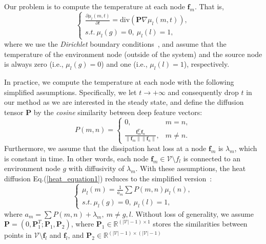 \documentclass[journal]{IEEEtran}
\begin{document}
Our problem is to compute the temperature at each node $\boldsymbol{f}_m$.
That is,
\begin{equation}\label{heat_equation1}
\left\{
\begin{array}{ll}
\frac{\partial \mu_{l}(m,t)}{\partial t}= \text{div}(\boldsymbol{P}\nabla \mu_l(m,t)),\\
s.t.~\mu_l(g)=0,~\mu_l(l)=1,
\end{array}
\right.
\end{equation}
where we use the \emph{Dirichlet} boundary conditions~\cite{weickert1998anisotropic},
and assume that the temperature of the environment node (outside of the system) and the source node
is always zero (i.e., $\mu_l(g)=0$) and one (i.e., $\mu_l(l)=1$), respectively.


In practice, we compute the temperature at each node with the following simplified assumptions.
Specifically, we let $t\rightarrow+\infty$ and consequently drop $t$ in our method
as we are interested in the steady state, and define the diffusion tensor $\boldsymbol{P}$
by the \emph{cosine} similarity between deep feature vectors:
\begin{equation}
 P(m,n)= \left\{
\begin{array}{ll}
0, & m=n,\\
\frac{\boldsymbol{f}_m^{T}\boldsymbol{f}_n}{\|\boldsymbol{f}_m\|\|\boldsymbol{f}_n\|}, & m\neq n.
\end{array}
\right.
\end{equation}
Furthermore, we assume that the dissipation heat loss at a node $\boldsymbol{f}_m$ is $\lambda_m$, which is constant in time.
In other words, each node $\boldsymbol{f}_m \in \mathcal {V} \setminus f_l$ is connected to an environment node $g$ with diffusivity of $\lambda_m$.
With these assumptions, the heat diffusion Eq.(\ref{heat_equation1}) reduces to the simplified version~\cite{weickert1998anisotropic,grady2006random}:
\begin{equation}\label{heat_equation2}
\left\{
\begin{array}{ll}
\mu_l(m)= \frac{1}{a_m}\sum P(m,n)\mu_l(n),\\
s.t.~\mu_l(g)=0,~\mu_l(l)=1,
\end{array}
\right.
\end{equation}
where $a_m = \sum P(m,n) + \lambda_m,~m \neq g, l$. Without loss of generality, we assume $\boldsymbol{P} = (0, \boldsymbol{P}_1^{T}; \boldsymbol{P}_1, \boldsymbol{P}_2)$,
where $\boldsymbol{P}_1 \in \mathbb{R}^{(|\mathcal {V}|-1)\times 1}$ stores the similarities between points in $\mathcal {V} \setminus \boldsymbol{f}_l$ and $\boldsymbol{f}_l$,  and $\boldsymbol{P}_2 \in \mathbb{R}^{(|\mathcal {V}|-1)\times (|\mathcal {V}|-1)}$
\end{document}

